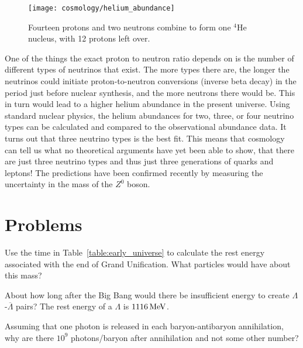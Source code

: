 \begin{figure}[tbp]
\begin{center}
\texttt{[image: cosmology/helium\_abundance]}
\caption{Fourteen protons and two neutrons combine to form one
  $^4$He nucleus, with 12 protons left over.}
\label{fig:helium_abundance}
\end{center}
\end{figure}

One of the things the exact proton to neutron ratio depends on is the
number of different types of neutrinos that exist.  The more types
there are, the longer the neutrinos could initiate proton-to-neutron
conversions (inverse beta decay) in the period just before nuclear
synthesis, and the more neutrons there would be.  This in turn would
lead to a higher helium abundance in the present universe.  Using
standard nuclear physics, the helium abundances for two, three, or
four neutrino types can be calculated and compared to the
observational abundance data.  It turns out that three neutrino types
is the best fit. This means that cosmology can tell us what no
theoretical arguments have yet been able to show, that there are just
three neutrino types and thus just three generations of quarks and
leptons!  The predictions have been confirmed recently by measuring
the uncertainty in the mass of the $Z^0$ boson.

\newpage

\section*{Problems}
\label{sec:cosmology_problems}

\begin{problem}
Use the time in Table~\ref{table:early_universe} to calculate
  the rest energy associated with the end of Grand Unification.  What
  particles would have about this mass?
\label{prob:grand_unification}
\end{problem}

\begin{problem}
About how long after the Big Bang would there be insufficient
  energy to create $\Lambda$-$\overline\Lambda$ pairs?  The rest
  energy of a $\Lambda$ is $1116\,\mbox{MeV}$.
\label{prob:Lambda_pair_production}
\end{problem}

\begin{problem}
 Assuming that one photon is released in each baryon-antibaryon
  annihilation, why are there $10^9$ photons/baryon after annihilation
  and not some other number?
\label{prob:baryon_abundance}
\end{problem}

